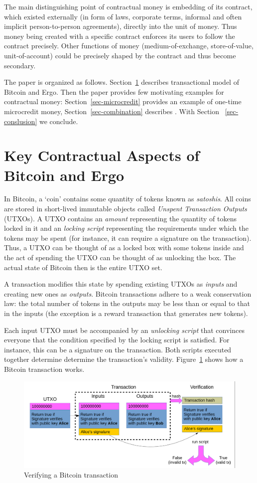 \documentclass[]{llncs}   %
\begin{document}
The main distinguishing point of contractual money is embedding of its contract, which existed externally (in form of laws, corporate terms, informal and often implicit person-to-person agreements), directly into the unit of money. Thus money being created with a specific contract enforces its users to follow the contract precisely. Other functions of money (medium-of-exchange, store-of-value, unit-of-account) could be precisely shaped by the contract and thus become secondary.

The paper is organized as follows. Section~\ref{sec-txmodel} describes transactional model of Bitcoin and Ergo. Then the paper provides few motivating examples for contractual money: Section~\ref{sec-microcredit} provides an example of one-time microcredit money, Section~\ref{sec-combination} describes . With Section
~\ref{sec-conslusion} we conclude.


\section{Key Contractual Aspects of Bitcoin and Ergo}
\label{sec-txmodel}

In Bitcoin, a `coin' contains some quantity of tokens known as {\em satoshis}. All coins are stored in short-lived immutable objects called {\em Unspent Transaction Outputs} (UTXOs). 
A UTXO contains an {\em amount} representing the quantity of tokens locked in it and an {\em locking script} representing the requirements under which the tokens may be spent (for instance, it can require a signature on the transaction). Thus, a UTXO can be thought of as a locked box with some tokens inside and the act of spending the UTXO can be thought of as unlocking the box.
The actual state of Bitcoin then is the entire UTXO set. 

A transaction modifies this state by spending existing UTXOs as {\em inputs} and creating new ones as {\em outputs}. 
Bitcoin transactions adhere to a weak conservation law: the total number of tokens in the outputs may be less than or equal to that in the inputs (the exception is a reward transaction that generates new tokens).

Each input UTXO must be accompanied by an {\em unlocking script} that convinces everyone that the condition specified by the locking script is satisfied. For instance, this can be a signature on the transaction. Both scripts executed together determine determine the transaction's validity.
Figure~\ref{fig1} shows how a Bitcoin transaction works.
\begin{figure}
	\includegraphics[scale=0.24]{bitcoin}
	\caption{Verifying a Bitcoin transaction}
	\label{fig1}
\end{figure}
\end{document}
